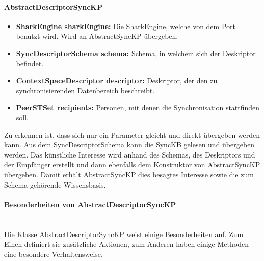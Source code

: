\documentclass[a4paper]{article}
\begin{document}
	\paragraph{AbstractDescriptorSyncKP}
	
	\begin{itemize}
		\item \textbf{SharkEngine sharkEngine:} Die SharkEngine, welche von
		dem Port benutzt wird. Wird an AbstractSyncKP übergeben.
		\item \textbf{SyncDescriptorSchema schema:} Schema, in welchem sich der
		Deskriptor befindet.
		\item \textbf{ContextSpaceDescriptor descriptor:} Deskriptor, der den
		zu synchronisierenden Datenbereich beschreibt.
		\item \textbf{PeerSTSet recipients:} Personen, mit denen die 
		Synchronisation stattfinden soll.
	\end{itemize}
	
	Zu erkennen ist, dass sich nur ein Parameter gleicht und direkt übergeben 
	werden kann. Aus dem SyncDescriptorSchema kann die SyncKB gelesen und
	übergeben werden. Das künstliche Interesse wird anhand des Schemas, des
	Deskriptors und der Empfänger erstellt und dann ebenfalls dem Konstruktor von
	AbstractSyncKP übergeben. Damit erhält AbstractSyncKP
	dies besagtes Interesse sowie die zum Schema gehörende Wissensbasis.
	
	\paragraph{Besonderheiten von AbstractDescriptorSyncKP}\mbox{} \\
	
	Die Klasse AbstractDescriptorSyncKP weist einige Besonderheiten auf. Zum
	Einen definiert sie zusätzliche Aktionen, zum Anderen haben einige Methoden
	eine besondere Verhaltensweise.
	
\end{document}
